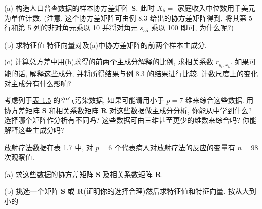 (a) 构造人口普查数据的样本协方差矩阵 $\mathbf{S}$, 此时 $X_5=$ 家庭收入中位数用千美元为单位计数. (注意, 这个协方差矩阵可由例 8.3 给出的协方差矩阵得到, 将其第 5 行和第 5 列的非对角元乘以 10 并将对角元 $s_{55}$ 乘以 100 即可, 为什么呢?)

(b) 求特征值-特征向量对及(a)中协方差矩阵的前两个样本主成分.

(c) 计算总方差中用(b)求得的前两个主成分解释的比例, 求相关系数 $r_{\hat{y}_i,x_k}$. 如果可能的话, 解释这些成分, 并将所得结果与例 8.3 的结果进行比较. 计数尺度上的变化对主成分有什么影响?

\quad 考虑列于\hyperref[tab:1.5]{表 1.5} 的空气污染数据, 如果可能请用小于 $p=7$ 维来综合这些数据. 用协方差矩阵 $\mathbf{S}$ 和相关系数矩阵 $\mathbf{R}$ 对这些数据做主成分分析, 你能从中学到什么? 选择哪个矩阵作分析有不同吗? 这些数据可由三维甚至更少的维数来综合吗? 你能解释这些主成分吗?

\quad 放射疗法数据在\hyperref[tab:1.7]{表 1.7} 中, 对 $p=6$ 个代表病人对放射疗法的反应的变量有 $n=98$ 次观察值.

(a) 求这些数据的协方差矩阵 $\mathbf{S}$ 及相关系数矩阵 $\mathbf{R}$.

(b) 挑选一个矩阵 $\mathbf{S}$ 或 $\mathbf{R}$(证明你的选择合理)然后求特征值和特征向量. 按从大到小的
